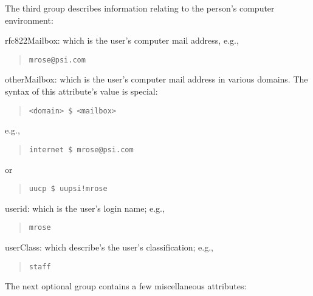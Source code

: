 The third group describes information relating to the person's
computer environment:
\begin{describe}
\item[rfc822Mailbox:]
			which is the user's computer mail address,
			e.g., 
\begin{quote}\small\begin{verbatim}
mrose@psi.com
\end{verbatim}\end{quote}

\item[otherMailbox:]
			which is the user's computer mail address
			in various domains.
			The syntax of this attribute's value is special:
\begin{quote}\small\begin{verbatim}
<domain> $ <mailbox>
\end{verbatim}\end{quote}
			e.g., 
\begin{quote}\small\begin{verbatim}
internet $ mrose@psi.com
\end{verbatim}\end{quote}
			or
\begin{quote}\small\begin{verbatim}
uucp $ uupsi!mrose
\end{verbatim}\end{quote}

\item[userid:]
			which is the user's login name; e.g.,
\begin{quote}\small\begin{verbatim}
mrose
\end{verbatim}\end{quote}

\item[userClass:]
			which describe's the user's classification; e.g.,
\begin{quote}\small\begin{verbatim}
staff
\end{verbatim}\end{quote}
\end{describe}
The next optional group contains a few miscellaneous attributes:
